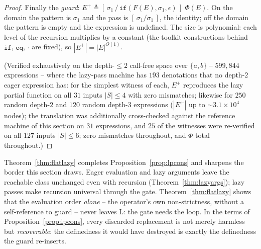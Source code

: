 \begin{proof}
    Finally the \emph{guard}: $E^{+} \triangleq
    [\,\sigma_1\,/\,\mathtt{if}(F(E),\sigma_1,\epsilon)\,]\;\Phi(E)$.
    On the domain the pattern is $\sigma_1$ and the pass is
    $[\,\sigma_1/\sigma_1\,]$, the identity; off the domain the pattern
    is empty and the expression is undefined.  The size is polynomial:
    each level of the recursion multiplies by a constant (the toolkit
    constructions behind $\mathtt{if}$, $\mathtt{eq}$, $\cdot$ are
    fixed), so $|E^{+}| = |E|^{O(1)}$.

    (Verified exhaustively on the depth-$\leq 2$ call-free space over
    $\{a,b\}$ -- $599{,}844$ expressions -- where the lazy-pass machine
    has $193$ denotations that no depth-$2$ eager expression has: for
    the simplest witness of each, $E^{+}$ reproduces the lazy partial
    function on all $31$ inputs $|S| \leq 4$ with zero mismatches;
    likewise for $250$ random depth-$2$ and $120$ random depth-$3$
    expressions ($|E^{+}|$ up to ${\sim}3.1 \times 10^4$ nodes); the
    translation was additionally cross-checked against the reference
    machine of this section on $31$ expressions, and $25$ of the
    witnesses were re-verified on all $127$ inputs $|S| \leq 6$; zero
    mismatches throughout, and $\Phi$ total throughout.)
\end{proof}

Theorem~\ref{thm:flatlazy} completes Proposition~\ref{prop:lpcons} and
sharpens the border this section draws.  Eager evaluation and lazy
arguments leave the reachable class unchanged even with recursion
(Theorem~\ref{thm:lazyargs}); lazy passes make recursion universal
through the gate.  Theorem~\ref{thm:flatlazy} shows that the evaluation
order \emph{alone} -- the operator's own non-strictness, without a
self-reference to guard -- never leaves $\mathrm{L}$: the gate needs
the loop.  In the terms of Proposition~\ref{prop:lpcons}, every
discarded replacement is not merely harmless but \emph{recoverable}:
the definedness it would have destroyed is exactly the definedness the
guard re-inserts.
